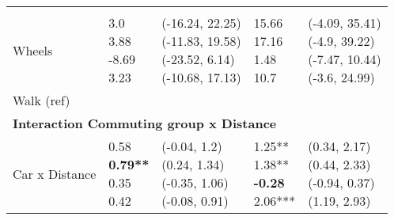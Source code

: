 \documentclass[10pt]{article}
\begin{document}
\begin{table}
\begin{center}
\begin{small}
\begin{tabular}{lllll}
& & & & \\ 
\quad Wheels    &  \makecell[l]{\textnormal{3.0\phantom{***}} \\\textnormal{3.88\phantom{***}} \\\textnormal{-8.69\phantom{***}} \\\textnormal{3.23\phantom{***}} \\}   &  \makecell[l]{\textnormal{(-16.24, 22.25)} \\\textnormal{(-11.83, 19.58)} \\\textnormal{(-23.52, 6.14)} \\\textnormal{(-10.68, 17.13)} \\}   &  \makecell[l]{\textnormal{15.66\phantom{***}} \\\textnormal{17.16\phantom{***}} \\\textnormal{1.48\phantom{***}} \\\textnormal{10.7\phantom{***}} \\}   &  \makecell[l]{\textnormal{(-4.09, 35.41)} \\\textnormal{(-4.9, 39.22)} \\\textnormal{(-7.47, 10.44)} \\\textnormal{(-3.6, 24.99)} \\} \\ 
\quad Walk (ref) & & & & \\ 
\multicolumn{5}{l}{\textbf{Interaction Commuting group x Distance}} \\ 
\quad Car x Distance    &  \makecell[l]{\textnormal{0.58\phantom{***}} \\\textbf{0.79**\phantom{*}} \\\textnormal{0.35\phantom{***}} \\\textnormal{0.42\phantom{***}} \\}   &  \makecell[l]{\textnormal{(-0.04, 1.2)} \\\textnormal{(0.24, 1.34)} \\\textnormal{(-0.35, 1.06)} \\\textnormal{(-0.08, 0.91)} \\}   &  \makecell[l]{\textnormal{1.25**\phantom{*}} \\\textnormal{1.38**\phantom{*}} \\\textbf{-0.28\phantom{***}} \\\textnormal{2.06***} \\}   &  \makecell[l]{\textnormal{(0.34, 2.17)} \\\textnormal{(0.44, 2.33)} \\\textnormal{(-0.94, 0.37)} \\\textnormal{(1.19, 2.93)} \\} \\ 

\end{tabular}
\end{small}
\end{center}
\end{table}
\end{document}
